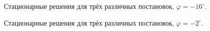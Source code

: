 \documentclass[14pt, a4paper, fleqn]{extarticle}
\begin{document}
\begin{figure}[H]
\caption{Стационарные решения для трёх различных постановок, $\varphi = -16^\circ$.}
\end{figure}


\begin{figure}[H]
\caption{Стационарные решения для трёх различных постановок, $\varphi = -2^\circ$.}
\end{figure}
\end{document}

